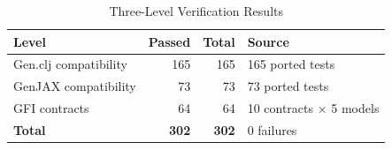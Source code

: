 \begin{table}[t]
\centering
\caption{Three-Level Verification Results}
\label{tab:verification}
\small
\begin{tabular}{lrrl}
\toprule
Level & Passed & Total & Source \\
\midrule
Gen.clj compatibility & 165 & 165 & 165 ported tests \\
GenJAX compatibility & 73 & 73 & 73 ported tests \\
GFI contracts & 64 & 64 & 10 contracts $\times$ 5 models \\
\midrule
\textbf{Total} & \textbf{302} & \textbf{302} & 0 failures \\
\bottomrule
\end{tabular}
\end{table}